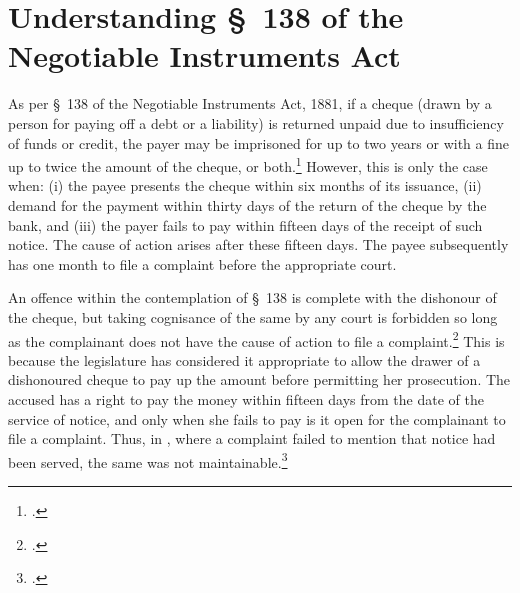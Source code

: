 \pagebreak

\section{Understanding \S~138 of the Negotiable Instruments Act} \label{app:understanding}

As per \S~138 of the Negotiable Instruments Act, 1881, if a cheque (drawn by a person for paying off a debt or a liability) is returned unpaid due to insufficiency of funds or credit, the payer may be imprisoned for up to two years or with a fine up to twice the amount of the cheque, or both.\footcite[A \textit{cheque} is defined as per \S~6 of the NI Act. It is a bill of exchange drawn on a specified banker and not expressed to be payable otherwise than on-demand. It includes the electronic image of a truncated cheque and a cheque in electronic form. Once a cheque has been signed and issued in favour of the holder of the cheque, there is a statutory presumption \S~139 of NI Act that the cheque is issued in discharge of a legally enforceable debt or liability. However, said presumption is a rebuttable one. The issuer of the cheque can rebut that presumption by adducing credible evidence that the cheque was issued for some other purpose like security for a loan.][]{sc2018_murugun} However, this is only the case when: (i) the payee presents the cheque within six months of its issuance, (ii) demand for the payment within thirty days of the return of the cheque by the bank, and (iii) the payer fails to pay within fifteen days of the receipt of such notice. The cause of action arises after these fifteen days. The payee subsequently has one month to file a complaint before the appropriate court.

An offence within the contemplation of \S~138 is complete with the dishonour of the cheque, but taking cognisance of the same by any court is forbidden so long as the complainant does not have the cause of action to file a complaint.\footcite{sc2014_dashrath} This is because the legislature has considered it appropriate to allow the drawer of a dishonoured cheque to pay up the amount before permitting her prosecution. The accused has a right to pay the money within fifteen days from the date of the service of notice, and only when she fails to pay is it open for the complainant to file a complaint. Thus, in , where a complaint failed to mention that notice had been served, the same was not maintainable.\footcite{sc2002_shakti}

